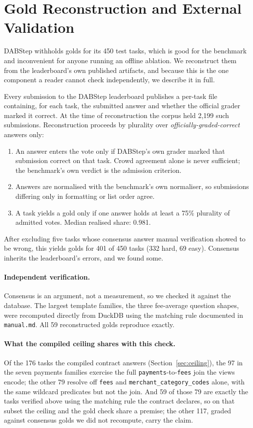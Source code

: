 \section{Gold Reconstruction and External Validation}
\label{app:golds}

DABStep withholds golds for its 450 test tasks, which is good for the
benchmark and inconvenient for anyone running an offline ablation. We
reconstruct them from the leaderboard's own published artifacts, and because
this is the one component a reader cannot check independently, we describe
it in full.

Every submission to the DABStep leaderboard publishes a per-task file
containing, for each task, the submitted answer and whether the official
grader marked it correct. At the time of reconstruction the corpus held
2{,}199 such submissions. Reconstruction proceeds by plurality over
\emph{officially-graded-correct} answers only:

\begin{enumerate}
\itemsep2pt
\item An answer enters the vote only if DABStep's own grader marked that
      submission correct on that task. Crowd agreement alone is never
      sufficient; the benchmark's own verdict is the admission criterion.
\item Answers are normalised with the benchmark's own normaliser, so
      submissions differing only in formatting or list order agree.
\item A task yields a gold only if one answer holds at least a 75\%
      plurality of admitted votes. Median realised share: 0.981.
\end{enumerate}

After excluding five tasks whose consensus answer manual verification showed
to be wrong, this yields golds for 401 of 450 tasks (332 hard, 69 easy).
Consensus inherits the leaderboard's errors, and we found some.

\paragraph{Independent verification.} Consensus is an argument, not a
measurement, so we checked it against the database. The largest template
families, the three fee-average question shapes, were recomputed directly
from DuckDB using the matching rule documented in \texttt{manual.md}. All 59
reconstructed golds reproduce exactly.

\paragraph{What the compiled ceiling shares with this check.} Of the 176
tasks the compiled contract answers (Section~\ref{sec:ceiling}), the 97 in
the seven payments families exercise the full
\texttt{payments}-to-\texttt{fees} join the views encode; the other 79
resolve off \texttt{fees} and \texttt{merchant\_category\_codes} alone, with
the same wildcard predicates but not the join. And 59 of those 79 are
exactly the tasks verified above using the matching rule the contract
declares, so on that subset the ceiling and the gold check share a premise;
the other 117, graded against consensus golds we did not recompute, carry
the claim.

